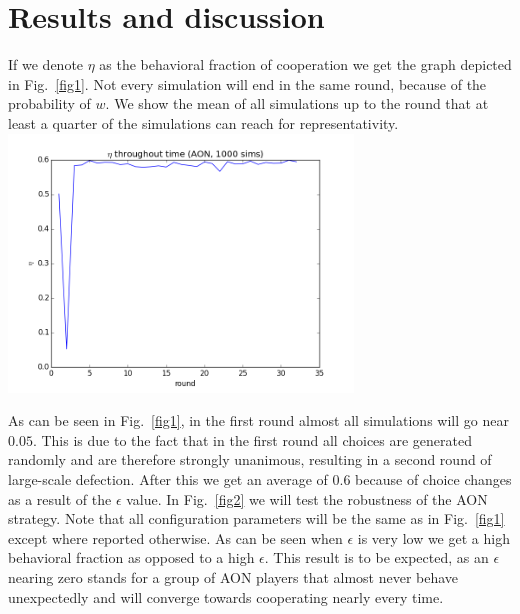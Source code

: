 \documentclass[letterpaper]{article}
\begin{document}
\section{Results and discussion}
If we denote $\eta$ as the behavioral fraction of cooperation we get the graph depicted in Fig.~\ref{fig1}. Not every simulation will end in the same round, because of the probability of $w$. We show the mean of all simulations up to the round that at least a quarter of the simulations can reach for representativity.
\vspace{5 mm}
\includegraphics[width=3.6in,angle=0]{img/cfraction_aon.png}
\label{fig1}
\vspace{5 mm}

As can be seen in Fig.~\ref{fig1}, in the first round almost all simulations will go near $0.05$. This is due to the fact that in the first round all choices are generated randomly and are therefore strongly unanimous, resulting in a second round of large-scale defection. After this we get an average of $0.6$ because of choice changes as a result of the $\epsilon$  value.
In Fig.~\ref{fig2} we will test the robustness of the AON strategy. Note that all configuration parameters will be the same as in Fig.~\ref{fig1} except where reported otherwise. As can be seen when $\epsilon$ is very low we get a high behavioral fraction as opposed to a high $\epsilon$. This result is to be expected, as an $\epsilon$ nearing zero stands for a group of AON players that almost never behave unexpectedly and will converge towards cooperating nearly every time.
\end{document}
